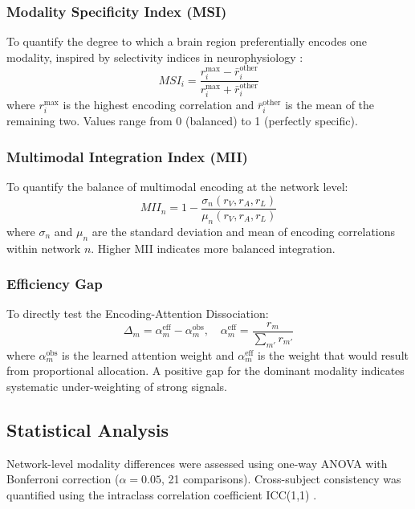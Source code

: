 \documentclass[conference]{IEEEtran}
\begin{document}
\subsubsection{Modality Specificity Index (MSI)}
To quantify the degree to which a brain region preferentially encodes one modality, inspired by selectivity indices in neurophysiology \cite{desimone1984stimulus}:
\begin{equation}\label{eq:msi}
MSI_i = \frac{r_i^{\max} - \bar{r}_i^{\text{other}}}{r_i^{\max} + \bar{r}_i^{\text{other}}}
\end{equation}
where $r_i^{\max}$ is the highest encoding correlation and $\bar{r}_i^{\text{other}}$ is the mean of the remaining two. Values range from 0 (balanced) to 1 (perfectly specific).

\subsubsection{Multimodal Integration Index (MII)}
To quantify the balance of multimodal encoding at the network level:
\begin{equation}\label{eq:mii}
MII_n = 1 - \frac{\sigma_n(r_V, r_A, r_L)}{\mu_n(r_V, r_A, r_L)}
\end{equation}
where $\sigma_n$ and $\mu_n$ are the standard deviation and mean of encoding correlations within network $n$. Higher MII indicates more balanced integration.

\subsubsection{Efficiency Gap}
To directly test the Encoding-Attention Dissociation:
\begin{equation}\label{eq:delta}
\Delta_m = \alpha_m^{\text{eff}} - \alpha_m^{\text{obs}}, \quad \alpha_m^{\text{eff}} = \frac{r_m}{\sum_{m'} r_{m'}}
\end{equation}
where $\alpha_m^{\text{obs}}$ is the learned attention weight and $\alpha_m^{\text{eff}}$ is the weight that would result from proportional allocation. A positive gap for the dominant modality indicates systematic under-weighting of strong signals.

\subsection{Statistical Analysis}

Network-level modality differences were assessed using one-way ANOVA with Bonferroni correction ($\alpha = 0.05$, 21 comparisons). Cross-subject consistency was quantified using the intraclass correlation coefficient ICC(1,1) \cite{shrout1979intraclass}.
\end{document}
